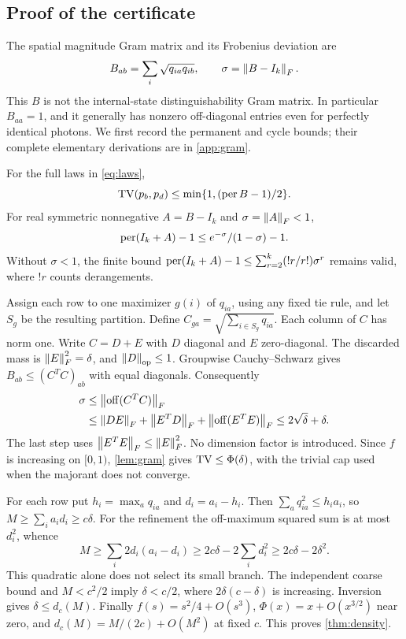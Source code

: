 \subsection{Proof of the certificate}
The spatial magnitude Gram matrix and its Frobenius deviation are
\begin{equation}
 B_{ab}=\sum_i\sqrt{q_{ia}q_{ib}},\qquad \sigma=\left\lVert B-I_k\right\rVert_F.\label{eq:gram}
\end{equation}
This $B$ is not the internal-state distinguishability Gram matrix. In particular $B_{aa}=1$, and it generally has nonzero off-diagonal entries even for perfectly identical photons. We first record the permanent and cycle bounds; their complete elementary derivations are in \cref{app:gram}.
\begin{lemma}\label{lem:gram}
For the full laws in \cref{eq:laws},
\begin{equation}
 \operatorname{TV}(p_b,p_d)\le\min\{1,(\operatorname{per} B-1)/2\}.
\end{equation}
For real symmetric nonnegative $A=B-I_k$ and $\sigma=\left\lVert A\right\rVert_F<1$,
\begin{equation}
 \operatorname{per}(I_k+A)-1\le e^{-\sigma}/(1-\sigma)-1.
\end{equation}
Without $\sigma<1$, the finite bound $\operatorname{per}(I_k+A)-1\le\sum_{r=2}^k(!r/r!)\sigma^r$ remains valid, where $!r$ counts derangements.
\end{lemma}

Assign each row to one maximizer $g(i)$ of $q_{ia}$, using any fixed tie rule, and let $S_g$ be the resulting partition. Define $C_{ga}=\sqrt{\sum_{i\in S_g}q_{ia}}$. Each column of $C$ has norm one. Write $C=D+E$ with $D$ diagonal and $E$ zero-diagonal. The discarded mass is $\left\lVert E\right\rVert_F^2=\delta$, and $\left\lVert D\right\rVert_{\mathrm{op}}\le1$. Groupwise Cauchy--Schwarz gives $B_{ab}\le(C^TC)_{ab}$ with equal diagonals. Consequently
\begin{align}
 \sigma&\le\left\lVert\operatorname{off}(C^TC)\right\rVert_F\nonumber\\
 &\le\left\lVert DE\right\rVert_F+\left\lVert E^TD\right\rVert_F+\left\lVert\operatorname{off}(E^TE)\right\rVert_F
 \le2\sqrt\delta+\delta.\label{eq:support}
\end{align}
The last step uses $\left\lVert E^TE\right\rVert_F\le\left\lVert E\right\rVert_F^2$. No dimension factor is introduced. Since $f$ is increasing on $[0,1)$, \cref{lem:gram} gives $\operatorname{TV}\le\Phi(\delta)$, with the trivial cap used when the majorant does not converge.

For each row put $h_i=\max_aq_{ia}$ and $d_i=a_i-h_i$. Then $\sum_aq_{ia}^2\le h_ia_i$, so $M\ge\sum_i a_id_i\ge c\delta$. For the refinement the off-maximum squared sum is at most $d_i^2$, whence
\begin{equation}
 M\ge\sum_i2d_i(a_i-d_i)\ge2c\delta-2\sum_i d_i^2
 \ge2c\delta-2\delta^2.\label{eq:quadratic}
\end{equation}
This quadratic alone does not select its small branch. The independent coarse bound and $M<c^2/2$ imply $\delta<c/2$, where $2\delta(c-\delta)$ is increasing. Inversion gives $\delta\le d_c(M)$. Finally $f(s)=s^2/4+O(s^3)$, $\Phi(x)=x+O(x^{3/2})$ near zero, and $d_c(M)=M/(2c)+O(M^2)$ at fixed $c$. This proves \cref{thm:density}.

